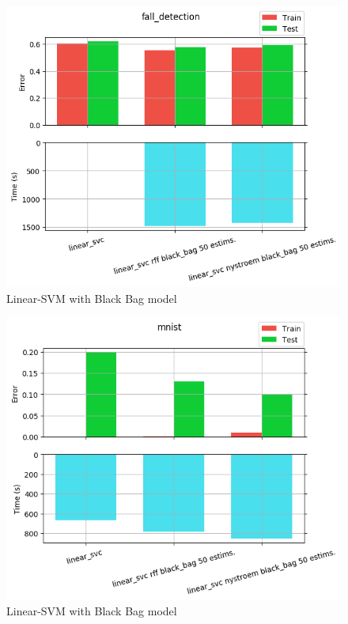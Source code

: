 \begin{figure}[th]
\centering
\includegraphics[scale=\imgscale]{Figures/2_6/fall_detection}
\decoRule
\caption[2.6 fall\tu detection]{Linear-SVM with Black Bag model}
\label{fig:2_6_fall_detection}
\end{figure}

\begin{figure}[th]
\centering
\includegraphics[scale=\imgscale]{Figures/2_6/mnist}
\decoRule
\caption[2.6 mnist]{Linear-SVM with Black Bag model}
\label{fig:2_6_mnist}
\end{figure}

